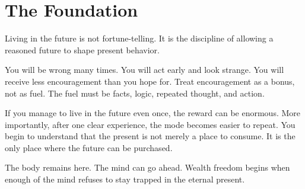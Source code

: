 \section*{The Foundation}

Living in the future is not fortune-telling. It is the discipline of allowing a reasoned future to shape present behavior.

You will be wrong many times. You will act early and look strange. You will receive less encouragement than you hope for. Treat encouragement as a bonus, not as fuel. The fuel must be facts, logic, repeated thought, and action.

If you manage to live in the future even once, the reward can be enormous. More importantly, after one clear experience, the mode becomes easier to repeat. You begin to understand that the present is not merely a place to consume. It is the only place where the future can be purchased.

The body remains here. The mind can go ahead. Wealth freedom begins when enough of the mind refuses to stay trapped in the eternal present.
